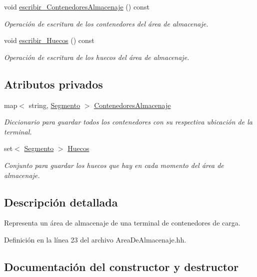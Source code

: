\begin{DoxyCompactItemize}
void \hyperlink{class_almacenaje_a5de7fa3a41e402feecac670c226a058f}{escribir\+\_\+\+Contenedores\+Almacenaje} () const
\begin{DoxyCompactList}\small\item\em Operación de escritura de los contenedores del área de almacenaje. \end{DoxyCompactList}\item 
void \hyperlink{class_almacenaje_a29e009f94265ea34b860f0918d3e1992}{escribir\+\_\+\+Huecos} () const
\begin{DoxyCompactList}\small\item\em Operación de escritura de los huecos del área de almacenaje. \end{DoxyCompactList}\end{DoxyCompactItemize}
\subsection*{Atributos privados}
\begin{DoxyCompactItemize}
\item 
map$<$ string, \hyperlink{class_segmento}{Segmento} $>$ \hyperlink{class_almacenaje_ab3cfe0feaf244094a7e2c5225ee681e6}{Contenedores\+Almacenaje}
\begin{DoxyCompactList}\small\item\em Diccionario para guardar todos los contenedores con su respectiva ubicación de la terminal. \end{DoxyCompactList}\item 
set$<$ \hyperlink{class_segmento}{Segmento} $>$ \hyperlink{class_almacenaje_ac7f1f8559babe3ac7841bb7f9e50d79a}{Huecos}
\begin{DoxyCompactList}\small\item\em Conjunto para guardar los huecos que hay en cada momento del área de almacenaje. \end{DoxyCompactList}\end{DoxyCompactItemize}


\subsection{Descripción detallada}
Representa un área de almacenaje de una terminal de contenedores de carga. 

Definición en la línea 23 del archivo Area\+De\+Almacenaje.\+hh.



\subsection{Documentación del constructor y destructor}
\mbox{\label{class_almacenaje_aac76140a19e358858ec775cae4d23037}} 
